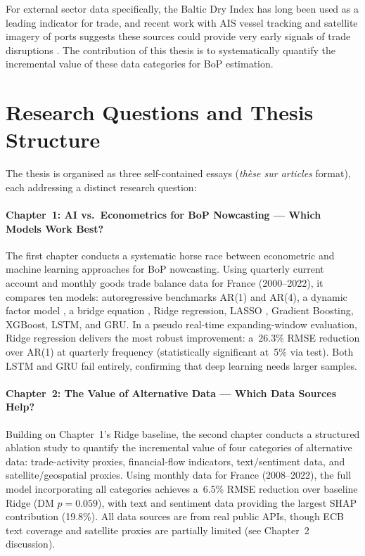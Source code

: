 For external sector data specifically, the Baltic Dry Index has long been used as a leading indicator for trade, and recent work with AIS vessel tracking and satellite imagery of ports suggests these sources could provide very early signals of trade disruptions \citep{donaldson2016view}.  The contribution of this thesis is to systematically quantify the incremental value of these data categories for BoP estimation.


\section*{Research Questions and Thesis Structure}

The thesis is organised as three self-contained essays (\emph{th\`ese sur articles} format), each addressing a distinct research question:

\paragraph{Chapter~1: AI vs.\ Econometrics for BoP Nowcasting --- Which Models Work Best?}
The first chapter conducts a systematic horse race between econometric and machine learning approaches for BoP nowcasting.  Using quarterly current account and monthly goods trade balance data for France (2000--2022), it compares ten models: autoregressive benchmarks AR(1) and AR(4), a dynamic factor model \citep{stock2002macroeconomic}, a bridge equation \citep{baffigi2004bridge}, Ridge regression, LASSO \citep{tibshirani1996regression}, Gradient Boosting, XGBoost, LSTM, and GRU.  In a pseudo real-time expanding-window evaluation, Ridge regression delivers the most robust improvement: a~26.3\% RMSE reduction over AR(1) at quarterly frequency (statistically significant at~5\% via \citealt{diebold1995comparing} test).  Both LSTM and GRU fail entirely, confirming that deep learning needs larger samples.

\paragraph{Chapter~2: The Value of Alternative Data --- Which Data Sources Help?}
Building on Chapter~1's Ridge baseline, the second chapter conducts a structured ablation study to quantify the incremental value of four categories of alternative data: trade-activity proxies, financial-flow indicators, text/sentiment data, and satellite/geospatial proxies.  Using monthly data for France (2008--2022), the full model incorporating all categories achieves a~6.5\% RMSE reduction over baseline Ridge (DM $p = 0.059$), with text and sentiment data providing the largest SHAP contribution (19.8\%).  All data sources are from real public APIs, though ECB text coverage and satellite proxies are partially limited (see Chapter~2 discussion).

